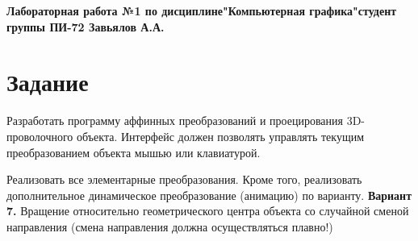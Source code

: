 \documentclass[a4paper,12pt]{article}
\begin{document}

\begin{center}
  \textbf{Лабораторная работа №1 по дисциплине\linebreak"Компьютерная графика"\linebreak{} студент группы ПИ-72 Завьялов А.А.}\\
\end{center}

\section{\normalsize{Задание}}
\begin{flushleft}
  Разработать программу аффинных преобразований и проецирования 3D-проволочного объекта. Интерфейс должен позволять управлять текущим преобразованием объекта мышью или клавиатурой.
\end{flushleft}

\begin{flushleft}
  Реализовать все элементарные преобразования. Кроме того, реализовать дополнительное динамическое преобразование (анимацию) по варианту.
  \linebreak\linebreak
  \textbf{Вариант 7.} Вращение относительно геометрического центра объекта со случайной сменой направления (смена направления должна осуществляться плавно!)
\end{flushleft}
\end{document}

